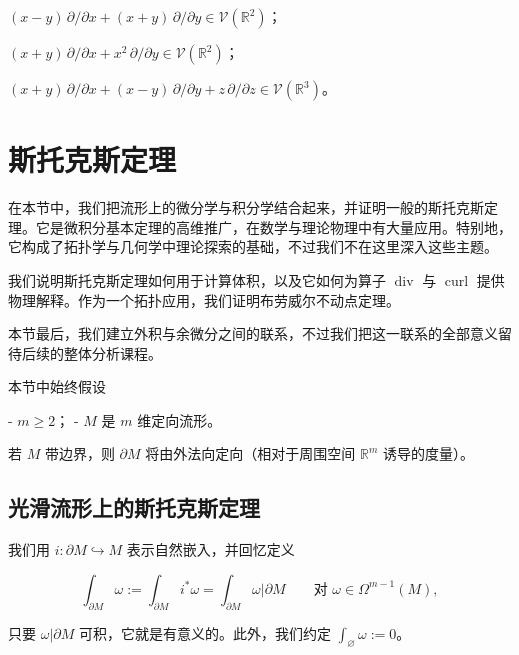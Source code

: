 \begin{exercises}
\begin{subitems}
\item

$ (x - y)\,\partial/\partial x + (x + y)\,\partial/\partial y \in \mathcal{V}(\mathbb{R}^2) $；

\item

$ (x + y)\,\partial/\partial x + x^2\,\partial/\partial y \in \mathcal{V}(\mathbb{R}^2) $；

\item

$ (x + y)\,\partial/\partial x + (x - y)\,\partial/\partial y + z\,\partial/\partial z \in \mathcal{V}(\mathbb{R}^3) $。

\end{subitems}

\end{exercises}

\section{斯托克斯定理}

在本节中，我们把流形上的微分学与积分学结合起来，并证明一般的斯托克斯定理。它是微积分基本定理的高维推广，在数学与理论物理中有大量应用。特别地，它构成了拓扑学与几何学中理论探索的基础，不过我们不在这里深入这些主题。

我们说明斯托克斯定理如何用于计算体积，以及它如何为算子 $ \operatorname{div} $ 与 $ \operatorname{curl} $ 提供物理解释。作为一个拓扑应用，我们证明布劳威尔不动点定理。

本节最后，我们建立外积与余微分之间的联系，不过我们把这一联系的全部意义留待后续的整体分析课程。

本节中始终假设

- $ m \ge 2 $；
- $ M $ 是 $ m $ 维定向流形。

若 $ M $ 带边界，则 $ \partial M $ 将由外法向定向（相对于周围空间 $ \mathbb{R}^m $ 诱导的度量）。

\subsection*{光滑流形上的斯托克斯定理}

我们用 $ i: \partial M \hookrightarrow M $ 表示自然嵌入，并回忆定义

\[
\int_{\partial M} \omega := \int_{\partial M} i^*\omega = \int_{\partial M} \omega|\partial M \qquad \text{对 } \omega \in \Omega^{m-1}(M),
\]

只要 $ \omega|\partial M $ 可积，它就是有意义的。此外，我们约定 $ \int_\varnothing \omega := 0 $。

